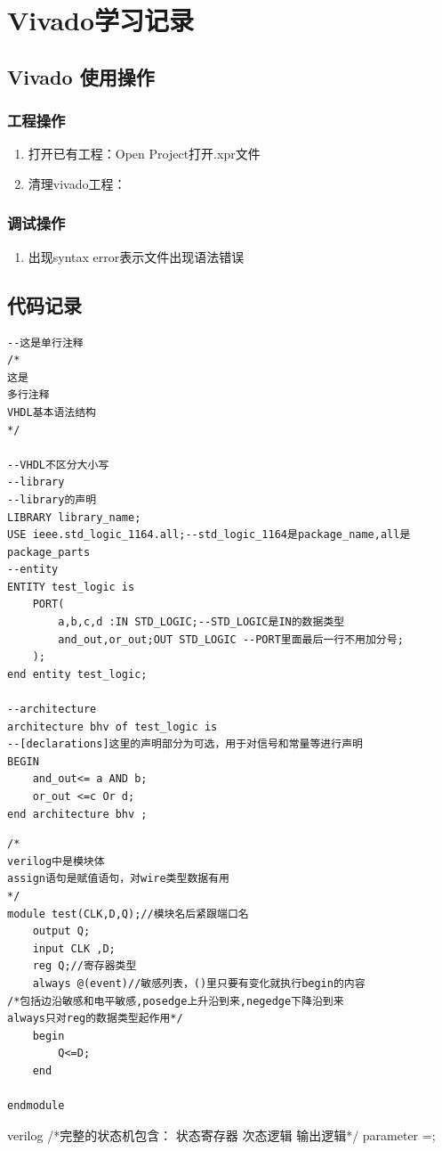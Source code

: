 \chapter{Vivado学习记录}
\section{Vivado 使用操作}
\subsection{工程操作}
\begin{enumerate}
    \item 打开已有工程：Open Project打开.xpr文件
    \item 清理vivado工程：
\end{enumerate}

\subsection{调试操作}
\begin{enumerate}
    \item 出现syntax error表示文件出现语法错误
\end{enumerate}

\section{代码记录}

\begin{verbatim}
--这是单行注释
/*
这是
多行注释
VHDL基本语法结构
*/

--VHDL不区分大小写
--library 
--library的声明
LIBRARY library_name;
USE ieee.std_logic_1164.all;--std_logic_1164是package_name,all是package_parts
--entity
ENTITY test_logic is
    PORT(
        a,b,c,d :IN STD_LOGIC;--STD_LOGIC是IN的数据类型
        and_out,or_out;OUT STD_LOGIC --PORT里面最后一行不用加分号;
    );
end entity test_logic;

--architecture
architecture bhv of test_logic is
--[declarations]这里的声明部分为可选，用于对信号和常量等进行声明
BEGIN
    and_out<= a AND b;
    or_out <=c Or d;
end architecture bhv ;
\end{verbatim}

\begin{verbatim}
/*
verilog中是模块体
assign语句是赋值语句，对wire类型数据有用
*/
module test(CLK,D,Q);//模块名后紧跟端口名
    output Q;
    input CLK ,D;
    reg Q;//寄存器类型
    always @(event)//敏感列表，()里只要有变化就执行begin的内容
/*包括边沿敏感和电平敏感,posedge上升沿到来,negedge下降沿到来
always只对reg的数据类型起作用*/
    begin
        Q<=D;
    end

endmodule
\end{verbatim}

\begin{myminted}[title=状态机语法]{verilog}
/*完整的状态机包含：
状态寄存器
次态逻辑
输出逻辑*/
parameter =;
\end{myminted}